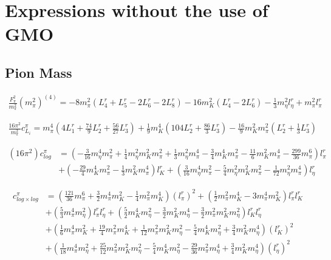 \documentclass[12pt,a4paper]{article}
\begin{document}
\appendix

\section{Expressions without the use of GMO}

\subsection{Pion Mass \label{SecPionMassPhysical}}

\begin{align}
	\frac{F_{\pi}^2}{m_{\pi}^2} (m_{\pi}^2)^{(4)} = -8 m_{\pi}^2 (L^r_{4}+L^r_{5}-2 L^r_{6}-2 L^r_{8})-16 m_{K}^2 (L^r_{4}-2 L^r_{6})-\frac{1}{3} m_{\eta}^2 l^r_{\eta} + m_{\pi}^2 l^r_{\pi}
\end{align}

\begin{align}
	\frac{16 \pi^2}{m_{\pi}^2} c^{\pi}_{L_i} = m_{\pi}^4 \left(4 L^r_{1}+\frac{74}{9} L^r_{2} + \frac{56}{27} L^r_{3} \right)+\frac{1}{9} m_{K}^4 \left(104 L^r_{2}+\frac{86}{3} L^r_{3} \right) - \frac{16}{9} m_{K}^2 m_{\pi}^2 \left(L^r_{2}+\frac{1}{3}L^r_{3} \right)
\end{align}

\begin{align}
	( 16 \pi^2 ) c^{\pi}_{log} & = \left( -\frac{3}{16} m_{\eta}^4 m_{\pi}^2 + \frac{1}{4} m_{\eta}^2 m_{K}^2 m_{\pi}^2 + \frac{1}{3} m_{\eta}^2 m_{\pi}^4 - \frac{3}{4} m_{K}^4 m_{\pi}^2 - \frac{11}{6} m_{K}^2 m_{\pi}^4 - \frac{299}{36} m_{\pi}^6 \right) l_{\pi}^r \nonumber \\
	& + \left( -\frac{29}{4} m_{K}^4 m_{\pi}^2 - \frac{1}{3} m_{K}^2 m_{\pi}^4 \right) l_{K}^r + \left( \frac{3}{16} m_{\eta}^4 m_{\pi}^2 - \frac{5}{4} m_{\eta}^2 m_{K}^2 m_{\pi}^2-\frac{1}{72} m_{\eta}^2 m_{\pi}^4 \right) l_{\eta}^r \label{clog}
\end{align}


\begin{align}
	c^{\pi}_{log \times log} & = \left( \frac{121}{36} m_{\pi}^6 + \frac{3}{2} m_{\pi}^4 m_{K}^2 - \frac{1}{4} m_{\pi}^2 m_{K}^4 \right) (l_{\pi}^r)^2  + \left( \frac{1}{2} m_{\pi}^2 m_{K}^4 - 3 m_{\pi}^4 m_{K}^2 \right) l_{\pi}^r l_{K}^r
 \nonumber \\ &
  + \left( \frac{5}{3} m_{\pi}^4 m_{\eta}^2 \right) l_{\pi}^r l_{\eta}^r
	 + \left( \frac{5}{2} m_{K}^4 m_{\eta}^2 - \frac{3}{2} m_{K}^2 m_{\eta}^4 - \frac{3}{2} m_{\pi}^2 m_{K}^2 m_{\eta}^2 \right) l_{K}^r l_{\eta}^r
 \nonumber \\ &
	 + \left( \frac{1}{6} m_{\pi}^4 m_{K}^2 + \frac{19}{4} m_{\pi}^2 m_{K}^4 + \frac{1}{12} m_{\pi}^2 m_{K}^2 m_{\eta}^2 - \frac{5}{4} m_{K}^4 m_{\eta}^2 + \frac{3}{4} m_{K}^2 m_{\eta}^4 \right) (l_{K}^r)^2 \nonumber \\
	& + \left( \frac{1}{18} m_{\pi}^4 m_{\eta}^2 + \frac{25}{12}  m_{\pi}^2 m_{K}^2 m_{\eta}^2 - \frac{5}{4} m_{K}^4 m_{\eta}^2 - \frac{29}{36} m_{\pi}^2 m_{\eta}^4 + \frac{3}{4} m_{K}^2 m_{\eta}^4 \right) (l_{\eta}^r)^2
 \label{cloglog}
\end{align}
\end{document}
